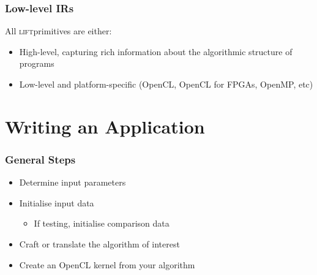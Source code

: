 \documentclass[10pt,usetotalslideindicator]{beamer}
\newcommand{\lift}{\textsc{lift}\space}
\begin{document}
\begin{frame}
\frametitle{Low-level IRs}
All \lift primitives are either:
\begin{itemize}
	\item High-level, capturing rich information about the algorithmic structure of programs
	\item Low-level and platform-specific (OpenCL, OpenCL for FPGAs, OpenMP, etc)
\end{itemize}
\end{frame}

\section{Writing an Application}

\begin{frame}
\frametitle{General Steps}
\begin{itemize}
    \item Determine input parameters 
    \item Initialise input data 
            \begin{itemize}
                \item If testing, initialise comparison data 
            \end{itemize}
    \item Craft or translate the algorithm of interest 
    \item Create an OpenCL kernel from your algorithm 
\end{itemize}
\end{frame}
\end{document}
